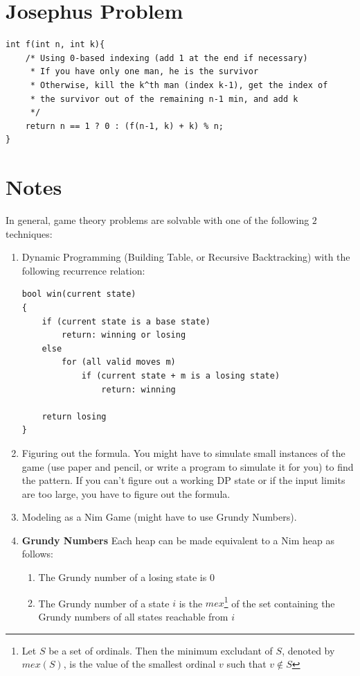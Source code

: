 \documentclass[12pt]{book}
\begin{document}
\section{Josephus Problem}
\begin{verbatim}
int f(int n, int k){
	/* Using 0-based indexing (add 1 at the end if necessary)
	 * If you have only one man, he is the survivor
	 * Otherwise, kill the k^th man (index k-1), get the index of
	 * the survivor out of the remaining n-1 min, and add k
	 */
	return n == 1 ? 0 : (f(n-1, k) + k) % n;
}
\end{verbatim}
\section{Notes}
In general, game theory problems are solvable with one of the following $2$ techniques:
\begin{enumerate}[label = \roman*.]
\item Dynamic Programming (Building Table, or Recursive Backtracking) with the following recurrence relation:
\begin{verbatim}
bool win(current state)
{
    if (current state is a base state)
        return: winning or losing
    else
        for (all valid moves m)
            if (current state + m is a losing state)
                return: winning
    
    return losing
}
\end{verbatim}
\item Figuring out the formula. You might have to simulate small instances of the game (use paper and pencil, or write a program to simulate it for you) to find the pattern. If you can't figure out a working DP state or if the input limits are too large, you have to figure out the formula.
\item Modeling as a Nim Game (might have to use Grundy Numbers).
\item \textbf{Grundy Numbers}
Each heap can be made equivalent to a Nim heap as follows:
\begin{enumerate}[label = \roman*.]
\item The Grundy number of a losing state is $0$
\item The Grundy number of a state $i$ is the $mex$\footnote{Let $S$ be a set of ordinals. Then the  minimum excludant of $S$, denoted by $mex(S)$, is the value of the smallest ordinal $v$ such that $v \notin S$} of the set containing the Grundy numbers of all states reachable from $i$
\end{enumerate}
\end{enumerate}
\end{document}
